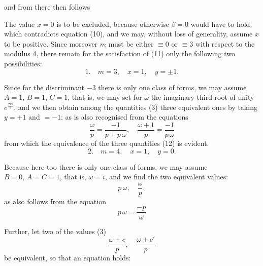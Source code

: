 and from
there then follows

The value $x=0$ is to be excluded, because otherwise $\beta=0$ would have to hold, which contradicts equation (10), and we may, without loss of generality, assume $x$ to be positive. Since moreover $m$ must be either $\equiv 0$ or $\equiv 3$ with respect to the modulus 4, there remain for the satisfaction of (11) only the following two possibilities:
\[
1.\quad m=3,\quad x=1,\quad y=\pm 1.
\]

Since for the discriminant $-3$ there is only one class of forms, we may assume $A=1,\,B=1,\,C=1$, that is, we may set for $\omega$ the imaginary third root of unity $e^{\frac{2\pi i}{3}}$, and we then obtain among the quantities (3) three equivalent ones by taking $y=+1$ and $=-1$: %
as is also recognised from the equations
\[
\frac{\omega}{p} = \frac{-1}{p+p\,\omega}, \quad \frac{\omega+1}{p} = \frac{-1}{p\,\omega}
\]
from which the equivalence of the three quantities (12) is evident.
\[
2.\quad m=4,\quad x=1,\quad y=0.
\]

Because here too there is only one class of forms, we may assume $B=0,\,A=C=1$, that is, $\omega=i$, and we find the two equivalent values:
\[
p\,\omega,\quad \frac{\omega}{p},
\]
as also follows from the equation
\[
p\,\omega = \frac{-p}{\omega}
\]

Further, let two of the values (3)
\[
\frac{\omega+c}{p}, \quad \frac{\omega+c'}{p}
\]
be equivalent, so that an equation holds:
